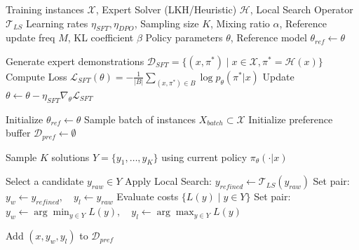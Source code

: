 \documentclass{article}
\theoremstyle{plain}
\theoremstyle{definition}
\theoremstyle{remark}
\begin{document}
\begin{algorithm}[h]
   \caption{ECO: Efficient Combinatorial Optimization Training Framework}
   \label{alg:eco_training}
\begin{algorithmic}[1]
    Training instances $\mathcal{X}$, Expert Solver (LKH/Heuristic) $\mathcal{H}$, Local Search Operator $\mathcal{T}_{LS}$
    Learning rates $\eta_{SFT}, \eta_{DPO}$, Sampling size $K$, Mixing ratio $\alpha$, Reference update freq $M$, KL coefficient $\beta$
    Policy parameters $\theta$, Reference model $\theta_{ref} \leftarrow \theta$
   
   \STATE {}
   \STATE Generate expert demonstrations $\mathcal{D}_{SFT} = \{(x, \pi^*) \mid x \in \mathcal{X}, \pi^* = \mathcal{H}(x)\}$
           \STATE Compute Loss $\mathcal{L}_{SFT}(\theta) = - \frac{1}{|B|} \sum_{(x, \pi^*) \in B} \log p_\theta(\pi^* | x)$
           \STATE Update $\theta \leftarrow \theta - \eta_{SFT} \nabla_\theta \mathcal{L}_{SFT}$
       \ENDFOR
   \ENDFOR

   \STATE {}
   \STATE Initialize $\theta_{ref} \leftarrow \theta$
       \STATE Sample batch of instances $X_{batch} \subset \mathcal{X}$
       \STATE Initialize preference buffer $\mathcal{D}_{pref} \leftarrow \emptyset$
       
           \STATE Sample $K$ solutions $Y = \{y_1, \dots, y_K\}$ using current policy $\pi_\theta(\cdot|x)$
           
           \STATE {}
               \STATE Select a candidate $y_{raw} \in Y$
               \STATE Apply Local Search: $y_{refined} \leftarrow \mathcal{T}_{LS}(y_{raw})$
               \STATE Set pair: $y_w \leftarrow y_{refined}, \quad y_l \leftarrow y_{raw}$ \quad {}
           \ELSE
               \STATE Evaluate costs $\{L(y) \mid y \in Y\}$
               \STATE Set pair: $y_w \leftarrow \arg\min_{y \in Y} L(y), \quad y_l \leftarrow \arg\max_{y \in Y} L(y)$
           \ENDIF
           
           \STATE Add $(x, y_w, y_l)$ to $\mathcal{D}_{pref}$
       \ENDFOR
       

\end{algorithmic}
\end{algorithm}
\end{document}
